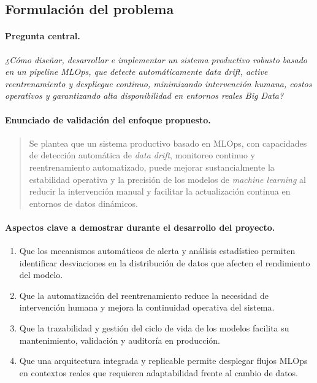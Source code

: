 \subsection{Formulación del problema}
\paragraph{Pregunta central.}
\textit{¿Cómo diseñar, desarrollar e implementar un sistema productivo robusto basado en un pipeline MLOps, que detecte automáticamente \emph{data drift}, active reentrenamiento y despliegue continuo, minimizando intervención humana, costos operativos y garantizando alta disponibilidad en entornos reales Big Data?}

\paragraph{Enunciado de validación del enfoque propuesto.}
\begin{quotation}
\noindent Se plantea que un sistema productivo basado en MLOps, con capacidades de detección automática de \emph{data drift}, monitoreo continuo y reentrenamiento automatizado, puede mejorar sustancialmente la estabilidad operativa y la precisión de los modelos de \emph{machine learning} al reducir la intervención manual y facilitar la actualización continua en entornos de datos dinámicos.
\end{quotation}

\paragraph{Aspectos clave a demostrar durante el desarrollo del proyecto.}
\begin{enumerate}
  \item Que los mecanismos automáticos de alerta y análisis estadístico permiten identificar desviaciones en la distribución de datos que afecten el rendimiento del modelo.
  \item Que la automatización del reentrenamiento reduce la necesidad de intervención humana y mejora la continuidad operativa del sistema.
  \item Que la trazabilidad y gestión del ciclo de vida de los modelos facilita su mantenimiento, validación y auditoría en producción.
  \item Que una arquitectura integrada y replicable permite desplegar flujos MLOps en contextos reales que requieren adaptabilidad frente al cambio de datos.
\end{enumerate}


